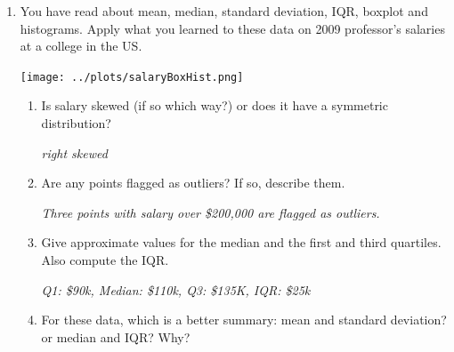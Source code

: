 \begin{enumerate}
\begin{key}
  {\it  Center is generally the easiest.  One could argue that spread
    is hard because you have to read the scales carefully, plus it
    depends on your amount of ambition for a good grade.  Skew is also
  hard because it require a close comparison of each tail. In this
  case, lots of A's are clearly preferred to an even spread or to more
D's.}
\end{key}



\item 
  You  have read about mean, median, standard deviation, IQR,
  boxplot and histograms.  Apply what you learned
  to these data on   2009 professor's salaries at a college in the US.

   \texttt{[image: ../plots/salaryBoxHist.png]}
  \begin{enumerate}
    \item  Is salary skewed (if so which way?) or does it have a
      symmetric distribution? 
\begin{students}
    \vspace{1cm}    
\end{students}

\begin{key}
  {\it  right skewed}
\end{key}

    \item Are any points flagged as outliers?  If so, describe them. 
\begin{students}
    \vspace{1cm}    
\end{students}

\begin{key}
  {\it Three points with salary over \$200,000 are flagged as outliers.}
\end{key}
     \item  Give approximate values for the median and the first and
       third quartiles.  Also compute the IQR.
\begin{students}
    \vspace{1cm}    
\end{students}

\begin{key}
  {\it  Q1: \$90k, Median: \$110k, Q3: \$135K, IQR: \$25k}
\end{key}
    \item For these data, which is a better summary: mean and standard
      deviation?  or median and IQR? Why?
\begin{students}
    \vspace{1cm}    
\end{students}


\end{enumerate}
\end{enumerate}
